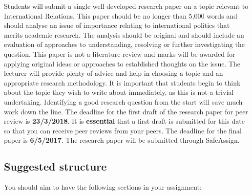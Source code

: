 \documentclass[12pt,a4paper]{article}
\begin{document}
Students will submit a single well developed research paper on a topic relevant to International Relations. This paper should be no longer than 5,000 words and should analyse an issue of importance relating to international politics that merits academic research. The analysis should be original and should include an evaluation of approaches to understanding, resolving or further investigating the question. This paper is not a literature review and marks will be awarded for applying original ideas or approaches to established thoughts on the issue. The lecturer will provide plenty of advice and help in choosing a topic and an appropriate research methodology. It is important that students begin to think about the topic they wish to write about immediately, as this is not a trivial undertaking. Identifying a good research question from the start will save much work down the line. The deadline for the first draft of the research paper for peer review is \textbf{23/3/2018}. It is \textbf{essential} that a first draft is submitted for this date so that you can receive peer reviews from your peers. The deadline for the final paper is \textbf{6/5/2017}. The research paper will be submitted through SafeAssign.

\subsection{Suggested structure}

You should aim to have the following sections in your assignment:
\end{document}
